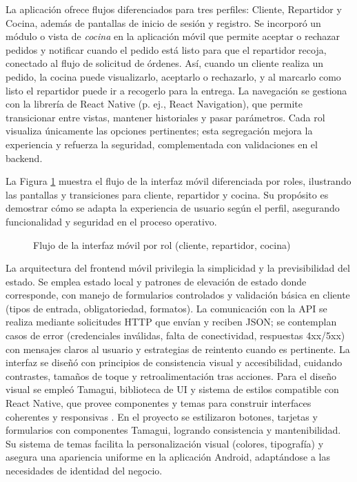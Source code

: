   La aplicación ofrece flujos diferenciados para tres perfiles: Cliente, Repartidor y Cocina, además de pantallas de inicio de sesión y registro. Se incorporó un módulo o vista de \textit{cocina} en la aplicación móvil que permite aceptar o rechazar pedidos y notificar cuando el pedido está listo para que el repartidor recoja, conectado al flujo de solicitud de órdenes. Así, cuando un cliente realiza un pedido, la cocina puede visualizarlo, aceptarlo o rechazarlo, y al marcarlo como listo el repartidor puede ir a recogerlo para la entrega. La navegación se gestiona con la librería de React Native (p. ej., React Navigation), que permite transicionar entre vistas, mantener historiales y pasar parámetros. Cada rol visualiza únicamente las opciones pertinentes; esta segregación mejora la experiencia y refuerza la seguridad, complementada con validaciones en el backend.

  La Figura \ref{fig:frontend-prototipo} muestra el flujo de la interfaz móvil diferenciada por roles, ilustrando las pantallas y transiciones para cliente, repartidor y cocina. Su propósito es demostrar cómo se adapta la experiencia de usuario según el perfil, asegurando funcionalidad y seguridad en el proceso operativo.

  \begin{figure}[htbp]
  \centering
  \resizebox{0.8\textwidth}{!}{}
  \caption[Flujo interfaz móvil]{Flujo de la interfaz móvil por rol (cliente, repartidor, cocina)}
  \label{fig:frontend-prototipo}
  \end{figure}

  La arquitectura del frontend móvil privilegia la simplicidad y la previsibilidad del estado. Se emplea estado local y patrones de elevación de estado donde corresponde, con manejo de formularios controlados y validación básica en cliente (tipos de entrada, obligatoriedad, formatos). La comunicación con la API se realiza mediante solicitudes HTTP que envían y reciben JSON; se contemplan casos de error (credenciales inválidas, falta de conectividad, respuestas 4xx/5xx) con mensajes claros al usuario y estrategias de reintento cuando es pertinente. La interfaz se diseñó con principios de consistencia visual y accesibilidad, cuidando contrastes, tamaños de toque y retroalimentación tras acciones. Para el diseño visual se empleó Tamagui, biblioteca de UI y sistema de estilos compatible con React Native, que provee componentes y temas para construir interfaces coherentes y responsivas \parencite{Tamagui_docs}. En el proyecto se estilizaron botones, tarjetas y formularios con componentes Tamagui, logrando consistencia y mantenibilidad. Su sistema de temas facilita la personalización visual (colores, tipografía) y asegura una apariencia uniforme en la aplicación Android, adaptándose a las necesidades de identidad del negocio.


